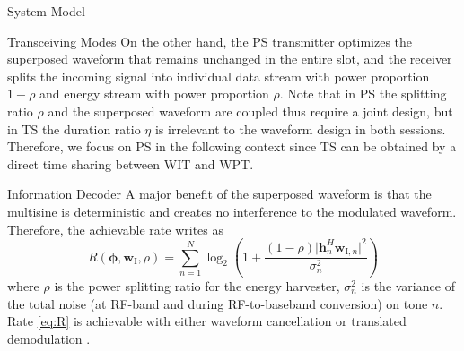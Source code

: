 \documentclass[journal]{IEEEtran}
\begin{document}
\begin{section}{System Model}
\begin{subsection}{Transceiving Modes}
			On the other hand, the PS transmitter optimizes the superposed waveform that remains unchanged in the entire slot, and the receiver splits the incoming signal into individual data stream with power proportion $1 - \rho$ and energy stream with power proportion $\rho$. Note that in PS the splitting ratio $\rho$ and the superposed waveform are coupled thus require a joint design, but in TS the duration ratio $\eta$ is irrelevant to the waveform design in both sessions. Therefore, we focus on PS in the following context since TS can be obtained by a direct time sharing between WIT and WPT.
		\end{subsection}


		\begin{subsection}{Information Decoder}
			A major benefit of the superposed waveform is that the multisine is deterministic and creates no interference to the modulated waveform. Therefore, the achievable rate writes as
			\begin{equation}\label{eq:R}
				R(\boldsymbol{\phi},\boldsymbol{w}_{\mathrm{I}},\rho) = \sum_{n=1}^N{\log_2\left(1+\frac{(1-\rho)\lvert \boldsymbol{h}_{n}^H\boldsymbol{w}_{\mathrm{I},n} \rvert^2}{\sigma_n^2}\right)}
			\end{equation}
			where $\rho$ is the power splitting ratio for the energy harvester, $\sigma_n^2$ is the variance of the total noise (at RF-band and during RF-to-baseband conversion) on tone $n$. Rate \eqref{eq:R} is achievable with either waveform cancellation or translated demodulation \cite{Clerckx2018b}.
		\end{subsection}



\end{section}
\end{document}

